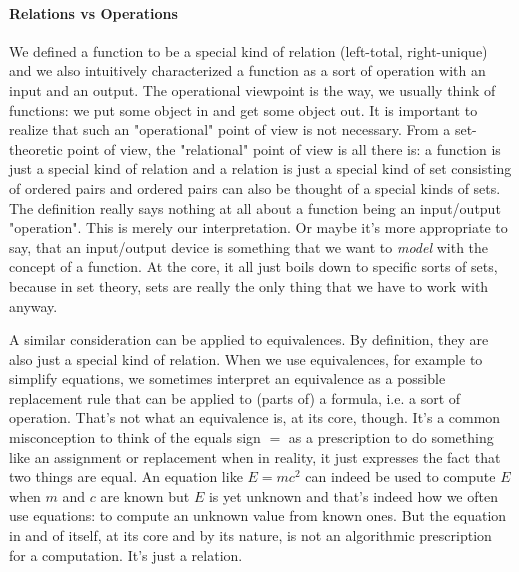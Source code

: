 \paragraph{Relations vs Operations}
We defined a function to be a special kind of relation (left-total, right-unique) and we also intuitively characterized a function as a sort of operation with an input and an output. The operational viewpoint is the way, we usually think of functions: we put some object in and get some object out. It is important to realize that such an "operational" point of view is not necessary. From a set-theoretic point of view, the "relational" point of view is all there is: a function is just a special kind of relation and a relation is just a special kind of set consisting of ordered pairs and ordered pairs can also be thought of a special kinds of sets. The definition really says nothing at all about a function being an input/output "operation". This is merely our interpretation. Or maybe it's more appropriate to say, that an input/output device is something that we want to \emph{model} with the concept of a function. At the core, it all just boils down to specific sorts of sets, because in set theory, sets are really the only thing that we have to work with anyway.

\medskip

A similar consideration can be applied to equivalences. By definition, they are also just a special kind of relation. When we use equivalences, for example to simplify equations, we sometimes interpret an equivalence as a possible replacement rule that can be applied to (parts of) a formula, i.e. a sort of operation. That's not what an equivalence is, at its core, though. It's a common misconception to think of the equals sign $=$ as a prescription to do something like an assignment or replacement when in reality, it just expresses the fact that two things are equal. An equation like $E = m c^2$ can indeed be used to compute $E$ when $m$ and $c$ are known but $E$ is yet unknown and that's indeed how we often use equations: to compute an unknown value from known ones. But the equation in and of itself, at its core and by its nature, is not an algorithmic prescription for a computation. It's just a relation.




